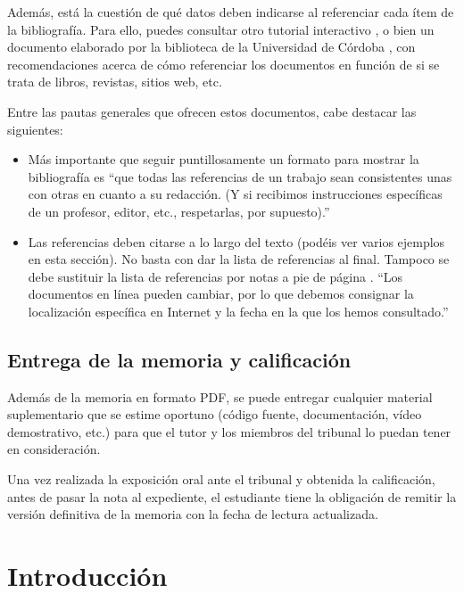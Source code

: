 \documentclass[pdftex,11pt,a4paper]{book}
\begin{document}
Además, está la cuestión de qué datos deben indicarse al referenciar cada ítem de la bibliografía. Para ello, puedes consultar otro tutorial interactivo \cite{bib:comocitar}, o bien un documento elaborado por la biblioteca de la Universidad de Córdoba \cite{bib:refBiblio}, con recomendaciones acerca de cómo referenciar los documentos en función de si se trata de libros, revistas, sitios web, etc. 

Entre las pautas generales que ofrecen estos documentos, cabe destacar las siguientes:
\begin{itemize}
\item
Más importante que seguir puntillosamente un formato para mostrar la bibliografía es ``que todas las referencias de un trabajo sean consistentes unas con otras en cuanto a su redacción. (Y si recibimos instrucciones específicas de un profesor, editor, etc., respetarlas, por supuesto).'' \cite{bib:refBiblio}
\item
Las referencias deben citarse a lo largo del texto (podéis ver varios ejemplos en esta sección). No basta con dar la lista de referencias al final. Tampoco se debe sustituir la lista de referencias por notas a pie de página \cite{bib:reglas}. ``Los documentos en línea pueden cambiar, por lo que debemos consignar la localización específica en Internet y la fecha en la que los hemos consultado.'' \cite{bib:refBiblio}
\end{itemize}

\section*{Entrega de la memoria y calificación}

Además de la memoria en formato PDF, se puede entregar cualquier material suplementario que se estime oportuno (código fuente, documentación, vídeo demostrativo, etc.) para que el tutor y los miembros del tribunal lo puedan tener en consideración.

Una vez realizada la exposición oral ante el tribunal y obtenida la calificación, antes de pasar la nota al expediente, el estudiante tiene la obligación de remitir la versión definitiva de la memoria con la fecha de lectura actualizada. 





\chapter{Introducción}
\end{document}
